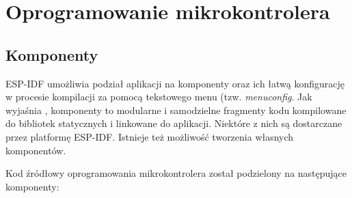     \section{Oprogramowanie mikrokontrolera}

        \subsection{Komponenty}

            ESP-IDF umożliwia podział aplikacji na komponenty oraz ich łatwą konfigurację w procesie kompilacji za pomocą tekstowego menu (tzw. \textit{menuconfig}. Jak wyjaśnia \cite{esp-idf-build-system}, komponenty to modularne i samodzielne fragmenty kodu kompilowane do bibliotek statycznych i linkowane do aplikacji. Niektóre z nich są dostarczane przez platformę ESP-IDF. Istnieje też możliwość tworzenia własnych komponentów.

            Kod źródłowy oprogramowania mikrokontrolera został podzielony na następujące komponenty:

